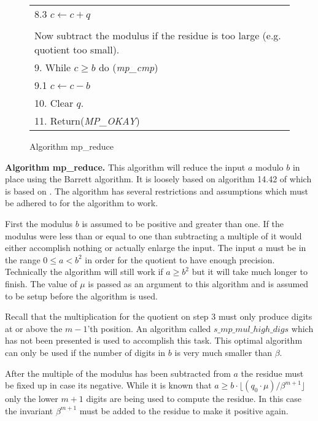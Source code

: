 \documentclass[b5paper]{book}
\begin{document}
\begin{figure}[!here]
\begin{small}
\begin{center}
\begin{tabular}{l}
\hspace{3mm}8.3  $c \leftarrow c + q$ \\
\\
Now subtract the modulus if the residue is too large (e.g. quotient too small). \\
9.  While $c \ge b$ do (\textit{mp\_cmp}) \\
\hspace{3mm}9.1  $c \leftarrow c - b$ \\
10.  Clear $q$. \\
11.  Return(\textit{MP\_OKAY}) \\
\hline
\end{tabular}
\end{center}
\end{small}
\caption{Algorithm mp\_reduce}
\end{figure}

\textbf{Algorithm mp\_reduce.}
This algorithm will reduce the input $a$ modulo $b$ in place using the Barrett algorithm.  It is loosely based on algorithm 14.42 of 
\cite[pp.  602]{HAC} which is based on \cite{BARRETT}.  The algorithm has several restrictions and assumptions which must be adhered to
for the algorithm to work.

First the modulus $b$ is assumed to be positive and greater than one.  If the modulus were less than or equal to one than subtracting
a multiple of it would either accomplish nothing or actually enlarge the input.  The input $a$ must be in the range $0 \le a < b^2$ in order
for the quotient to have enough precision.  Technically the algorithm will still work if $a \ge b^2$ but it will take much longer to finish.  The
value of $\mu$ is passed as an argument to this algorithm and is assumed to be setup before the algorithm is used.  

Recall that the multiplication for the quotient on step 3 must only produce digits at or above the $m-1$'th position.  An algorithm called 
$s\_mp\_mul\_high\_digs$ which has not been presented is used to accomplish this task.  This optimal algorithm can only be used if the number
of digits in $b$ is very much smaller than $\beta$.  

After the multiple of the modulus has been subtracted from $a$ the residue must be fixed up in case its negative.  While it is known that 
$a \ge b \cdot \lfloor (q_0 \cdot \mu) / \beta^{m+1} \rfloor$ only the lower $m+1$ digits are being used to compute the residue.  In this case 
the invariant $\beta^{m+1}$ must be added to the residue to make it positive again.  
\end{document}
